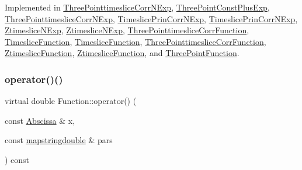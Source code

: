 Implemented in \mbox{\hyperlink{classThreePointtimesliceCorrNExp_a4d3143ae44c362e4dae6221ace8f1c02}{Three\+Pointtimeslice\+Corr\+N\+Exp}}, \mbox{\hyperlink{classThreePointConstPlusExp_aabb955a37221d2dc9cff3528a1564584}{Three\+Point\+Const\+Plus\+Exp}}, \mbox{\hyperlink{classThreePointtimesliceCorrNExp_a4d3143ae44c362e4dae6221ace8f1c02}{Three\+Pointtimeslice\+Corr\+N\+Exp}}, \mbox{\hyperlink{classTimeslicePrinCorrNExp_a9a55af8256beba8993e5163bdab55571}{Timeslice\+Prin\+Corr\+N\+Exp}}, \mbox{\hyperlink{classTimeslicePrinCorrNExp_a9a55af8256beba8993e5163bdab55571}{Timeslice\+Prin\+Corr\+N\+Exp}}, \mbox{\hyperlink{classZtimesliceNExp_af9ac01b3a80221dd8bf1a0a11cbdbb66}{Ztimeslice\+N\+Exp}}, \mbox{\hyperlink{classZtimesliceNExp_af9ac01b3a80221dd8bf1a0a11cbdbb66}{Ztimeslice\+N\+Exp}}, \mbox{\hyperlink{classThreePointtimesliceCorrFunction_af4198f5c0d9085c5dcc8d79447d54348}{Three\+Pointtimeslice\+Corr\+Function}}, \mbox{\hyperlink{classTimesliceFunction_ac4426035b36872933c70b5e0ad8cb4e3}{Timeslice\+Function}}, \mbox{\hyperlink{classTimesliceFunction_ac4426035b36872933c70b5e0ad8cb4e3}{Timeslice\+Function}}, \mbox{\hyperlink{classThreePointtimesliceCorrFunction_af4198f5c0d9085c5dcc8d79447d54348}{Three\+Pointtimeslice\+Corr\+Function}}, \mbox{\hyperlink{classZtimesliceFunction_ae7851ae590054311c69cdafc8f7ed621}{Ztimeslice\+Function}}, \mbox{\hyperlink{classZtimesliceFunction_ae7851ae590054311c69cdafc8f7ed621}{Ztimeslice\+Function}}, and \mbox{\hyperlink{classThreePointFunction_a02550dd7bdee83aab6967d304bb40ff1}{Three\+Point\+Function}}.

\mbox{\label{classFunction_a8cd7f815d5f883cc523341c53ba811d0}} 
\subsubsection{\texorpdfstring{operator()()}{operator()()}\hspace{0.1cm}{\footnotesize\ttfamily [2/2]}}
{\footnotesize\ttfamily virtual double Function\+::operator() (\begin{DoxyParamCaption}\item[{const \mbox{\hyperlink{classAbscissa}{Abscissa}} \&}]{x,  }\item[{const \mbox{\hyperlink{lib_2fitting__lib_2includes_8h_a647b481c557c7966517f753340a81d13}{mapstringdouble}} \&}]{pars }\end{DoxyParamCaption}) const\hspace{0.3cm}{\ttfamily [pure virtual]}}



